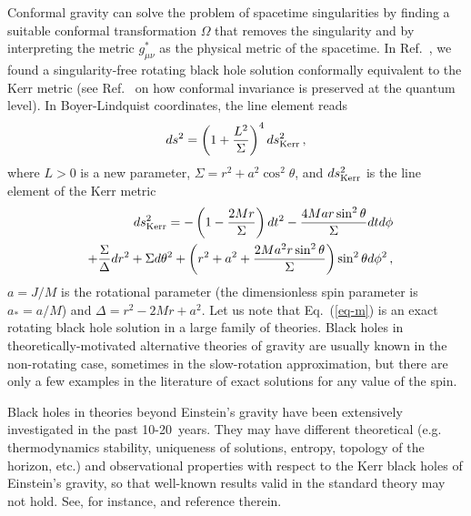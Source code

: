 \documentclass[aps, prd, amsmath, floats, floatfix, twocolumn, nofootinbib, superscriptaddress, showpacs]{revtex4-1}
\newcommand{\be}{\begin{eqnarray}}
\newcommand{\ee}{\end{eqnarray}}
\begin{document}
Conformal gravity can solve the problem of spacetime singularities by finding a suitable conformal transformation $\Omega$ that removes the singularity and by interpreting the metric $g_{\mu\nu}^*$ as the physical metric of the spacetime. In Ref.~\cite{metric}, we found a singularity-free rotating black hole solution conformally equivalent to the Kerr metric (see Ref.~\cite{m-q} on how conformal invariance is preserved at the quantum level). In Boyer-Lindquist coordinates, the line element reads
\be\label{eq-m}
ds^2 = \left(1 + \frac{L^2}{\Sigma}\right)^4 ds^2_{\rm Kerr} \, ,
\ee
where $L > 0$ is a new parameter, $\Sigma = r^2 + a^2 \cos^2\theta$, and $ds^2_{\rm Kerr}$ is the line element of the Kerr metric
\be
&& \hspace{-0.1cm}
ds^2_{\rm Kerr} = - \left(1 - \frac{2 M r}{\Sigma}\right) dt^2 
- \frac{4 M a r \sin^2\theta}{\Sigma} dt d\phi \\
&& \hspace{-0.1cm}
+ \frac{\Sigma}{\Delta} dr^2 
+ \Sigma d\theta^2  + \left(r^2 + a^2 + \frac{2 M a^2 r \sin^2\theta}{\Sigma} \right) 
\sin^2\theta d\phi^2 \, , \nonumber 
\ee
$a = J/M$ is the rotational parameter (the dimensionless spin parameter is $a_* = a/M$) and $\Delta = r^2 - 2 M r + a^2$. Let us note that Eq.~(\ref{eq-m}) is an exact rotating black hole solution in a large family of theories. Black holes in theoretically-motivated alternative theories of gravity are usually known in the non-rotating case, sometimes in the slow-rotation approximation, but there are only a few examples in the literature of exact solutions for any value of the spin.


Black holes in theories beyond Einstein's gravity have been extensively investigated in the past 10-20~years. They may have different theoretical (e.g. thermodynamics stability, uniqueness of solutions, entropy, topology of the horizon, etc.) and observational properties with respect to the Kerr black holes of Einstein's gravity, so that well-known results valid in the standard theory may not hold. See, for instance, \cite{ppp0,ppp1,ppp2,Berti:2015itd,review} and reference therein.
\end{document}
